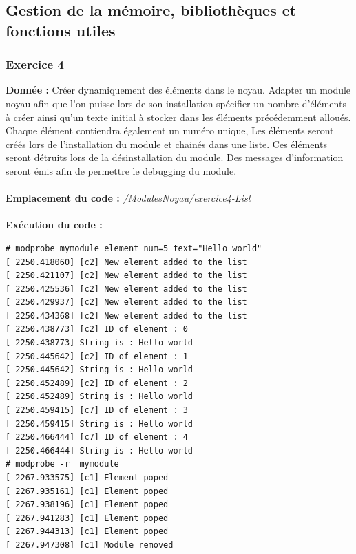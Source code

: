 \subsection{Gestion de la mémoire, bibliothèques et fonctions utiles}
\subsubsection{Exercice 4}
\noindent
\textbf{Donnée : }Créer dynamiquement des éléments dans le noyau. Adapter un module noyau afin que l'on puisse lors de son installation spécifier un nombre d'éléments à créer ainsi qu'un texte initial à stocker dans les éléments précédemment alloués. Chaque élément contiendra également un numéro unique, Les éléments seront créés lors de l'installation du module et chainés dans une liste. Ces éléments seront détruits lors de la désinstallation du module. Des messages d'information seront émis afin de permettre le debugging du module.\\\\
\textbf{Emplacement du code : } \textit{/ModulesNoyau/exercice4-List}\\\\
\textbf{Exécution du code : }
\begin{lstlisting}
# modprobe mymodule element_num=5 text="Hello world"                            
[ 2250.418060] [c2] New element added to the list                               
[ 2250.421107] [c2] New element added to the list                               
[ 2250.425536] [c2] New element added to the list                               
[ 2250.429937] [c2] New element added to the list                               
[ 2250.434368] [c2] New element added to the list                               
[ 2250.438773] [c2] ID of element : 0                                           
[ 2250.438773] String is : Hello world                                          
[ 2250.445642] [c2] ID of element : 1                                           
[ 2250.445642] String is : Hello world                                          
[ 2250.452489] [c2] ID of element : 2                                           
[ 2250.452489] String is : Hello world                                          
[ 2250.459415] [c7] ID of element : 3                                           
[ 2250.459415] String is : Hello world                                          
[ 2250.466444] [c7] ID of element : 4                                           
[ 2250.466444] String is : Hello world                                          
# modprobe -r  mymodule                                                         
[ 2267.933575] [c1] Element poped                                               
[ 2267.935161] [c1] Element poped                                               
[ 2267.938196] [c1] Element poped                                               
[ 2267.941283] [c1] Element poped                                               
[ 2267.944313] [c1] Element poped                                               
[ 2267.947308] [c1] Module removed
\end{lstlisting}

